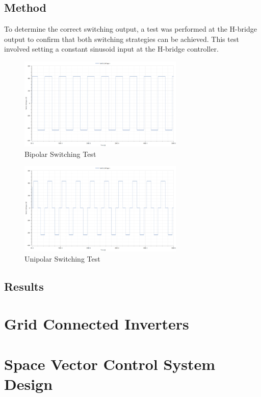 \documentclass[12pt,twoside]{scrartcl}
\begin{document}
\subsection{Method}
To determine the correct switching output, a test was performed at the H-bridge output to confirm that both
switching strategies can be achieved. 
This test involved setting a constant sinusoid input at the H-bridge controller.
\begin{figure}[htp]
    \centering
    \includegraphics[width=0.7\textwidth]{Bipolar_sw.png}
    \caption{Bipolar Switching Test}
    \label{fig:Bipolar Switching}
\end{figure}
\begin{figure}[htp]
    \centering
    \includegraphics[width=0.7\textwidth]{Unipolar_sw.png}
    \caption{Unipolar Switching Test}
    \label{fig:Unipolar Switching}
\end{figure}
\newpage
\noindent


\subsection{Results}


\section{Grid Connected Inverters}
\section{Space Vector Control System Design}



\newpage


\end{document}

